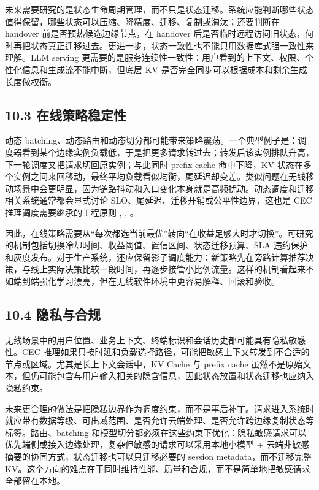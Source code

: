未来需要研究的是状态生命周期管理，而不只是状态迁移。系统应能判断哪些状态值得保留，哪些状态可以压缩、降精度、迁移、复制或淘汰；还要判断在 handover 前是否预热候选边缘节点，在 handover 后是否临时远程访问旧状态，何时再把状态真正迁移过去。更进一步，状态一致性也不能只用数据库式强一致性来理解。LLM serving 更需要的是服务连续性一致性：用户看到的上下文、权限、个性化信息和生成流不能中断，但底层 KV 是否完全同步可以根据成本和剩余生成长度做权衡。


\subsection*{10.3 在线策略稳定性}

动态 batching、动态路由和动态切分都可能带来策略震荡。一个典型例子是：调度器看到某个边缘实例负载低，于是把更多请求转过去；转发后该实例排队升高，下一轮调度又把请求切回原实例；与此同时 prefix cache 命中下降，KV 状态在多个实例之间来回移动，最终平均负载看似均衡，尾延迟却变差。类似问题在无线移动场景中会更明显，因为链路抖动和入口变化本身就是高频扰动。动态调度和迁移相关系统通常都会显式讨论 SLO、尾延迟、迁移开销或公平性边界，这也是 CEC 推理调度需要继承的工程原则 \cite{zhong2024distserve}, \cite{sun2024llumnix}, \cite{sheng2024fairness}。

因此，在线策略需要从“每次都选当前最优”转向“在收益足够大时才切换”。可研究的机制包括切换冷却时间、收益阈值、置信区间、状态迁移预算、SLA 违约保护和灰度发布。对于生产系统，还应保留影子调度能力：新策略先在旁路计算推荐决策，与线上实际决策比较一段时间，再逐步接管小比例流量。这样的机制看起来不如端到端强化学习漂亮，但在无线软件环境中更容易解释、回滚和验收。


\subsection*{10.4 隐私与合规}

无线场景中的用户位置、业务上下文、终端标识和会话历史都可能具有隐私敏感性。CEC 推理如果只按时延和负载选择路径，可能把敏感上下文转发到不合适的节点或区域。尤其是长上下文会话中，KV Cache 与 prefix cache 虽然不是原始文本，但仍可能包含与用户输入相关的隐含信息，因此状态放置和状态迁移也应纳入隐私约束。

未来更合理的做法是把隐私边界作为调度约束，而不是事后补丁。请求进入系统时就应带有数据等级、可出域范围、是否允许云端处理、是否允许跨边缘复制状态等标签。路由、batching 和模型切分都必须在这些约束下优化：隐私敏感请求可以优先端侧或接入边缘处理，复杂但敏感的请求可以采用本地小模型 + 云端非敏感摘要的协同方式，状态迁移也可以只迁移必要的 session metadata，而不迁移完整 KV。这个方向的难点在于同时维持性能、质量和合规，而不是简单地把敏感请求全部留在本地。


